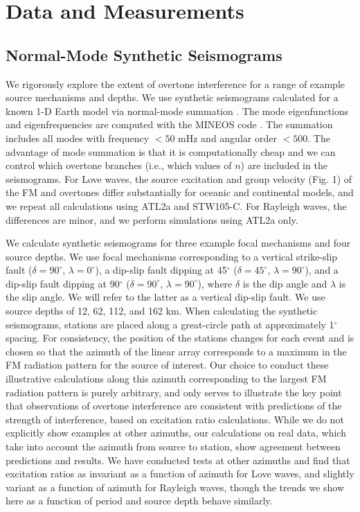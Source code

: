 \documentclass[extra,mreferee]{gji}
\begin{document}
\section{Data and Measurements}
\subsection{Normal-Mode Synthetic Seismograms }
We rigorously explore the extent of overtone interference for a range of example source mechanisms and depths. We use synthetic seismograms calculated for a known 1-D Earth model via normal-mode summation \citep{gilbert1971excitation}. The mode eigenfunctions and eigenfrequencies are computed with the MINEOS code \citep{mineosbro}. The summation includes all modes with frequency $< 50$ mHz and angular order $< 500$. The advantage of mode summation is that it is computationally cheap and we can control which overtone branches (i.e., which values of $n$) are included in the seismograms.
For Love waves, the source excitation and group velocity (Fig. 1) of the FM and overtones differ substantially  for oceanic and continental models, and we repeat all calculations using ATL2a and STW105-C. For Rayleigh waves, the differences are minor, and we perform simulations using ATL2a only. 

We calculate synthetic seismograms for three example focal mechanisms and four source depths. We use focal mechanisms corresponding to a vertical strike-slip fault ($\delta=90^\circ$, $\lambda=0^\circ$), a dip-slip fault dipping at 45$^\circ$ ($\delta=45^\circ$, $\lambda=90^\circ$), and a dip-slip fault dipping at 90$^\circ$ ($\delta=90^\circ$, $\lambda=90^\circ$), where $\delta$ is the dip angle and $\lambda$ is the slip angle. We will refer to the latter as a vertical dip-slip fault. We use source depths of 12, 62, 112, and 162 km. When calculating the synthetic seismograms, stations are placed along a great-circle path at approximately 1$^\circ$ spacing. For consistency, the position of the stations changes for each event and is chosen so that the azimuth of the linear array corresponds to a maximum in the FM radiation pattern for the source of interest. Our choice to conduct these illustrative calculations along this azimuth corresponding to the largest FM radiation pattern is purely arbitrary, and only serves to illustrate the key point that observations of overtone interference are consistent with predictions of the strength of interference, based on excitation ratio calculations. While we do not explicitly show examples at other azimuths, our calculations on real data, which take into account the azimuth from source to station, show agreement between predictions and results. We have conducted tests at other azimuths and find that excitation ratios as invariant as a function of azimuth for Love waves, and slightly variant as a function of azimuth for Rayleigh waves, though the trends we show here as a function of period and source depth behave similarly. 
\end{document}
